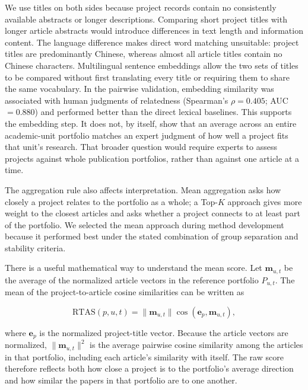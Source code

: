 \documentclass[pdflatex,sn-apa]{sn-jnl}
\begin{document}
We use titles on both sides because project records contain no consistently available abstracts or longer descriptions. Comparing short project titles with longer article abstracts would introduce differences in text length and information content. The language difference makes direct word matching unsuitable: project titles are predominantly Chinese, whereas almost all article titles contain no Chinese characters. Multilingual sentence embeddings allow the two sets of titles to be compared without first translating every title or requiring them to share the same vocabulary. In the pairwise validation, embedding similarity was associated with human judgments of relatedness (Spearman's $\rho=0.405$; AUC $=0.880$) and performed better than the direct lexical baselines. This supports the embedding step. It does not, by itself, show that an average across an entire academic-unit portfolio matches an expert judgment of how well a project fits that unit's research. That broader question would require experts to assess projects against whole publication portfolios, rather than against one article at a time.

The aggregation rule also affects interpretation. Mean aggregation asks how closely a project relates to the portfolio as a whole; a Top-$K$ approach gives more weight to the closest articles and asks whether a project connects to at least part of the portfolio. We selected the mean approach during method development because it performed best under the stated combination of group separation and stability criteria.

There is a useful mathematical way to understand the mean score. Let $\mathbf m_{u,t}$ be the average of the normalized article vectors in the reference portfolio $P_{u,t}$. The mean of the project-to-article cosine similarities can be written as

\begin{equation}
\mathrm{RTAS}(p,u,t)=
\|\mathbf m_{u,t}\|\cos(\mathbf e_p,\mathbf m_{u,t}),
\end{equation}

where $\mathbf e_p$ is the normalized project-title vector. Because the article vectors are normalized, $\|\mathbf m_{u,t}\|^2$ is the average pairwise cosine similarity among the articles in that portfolio, including each article's similarity with itself. The raw score therefore reflects both how close a project is to the portfolio's average direction and how similar the papers in that portfolio are to one another.
\end{document}
